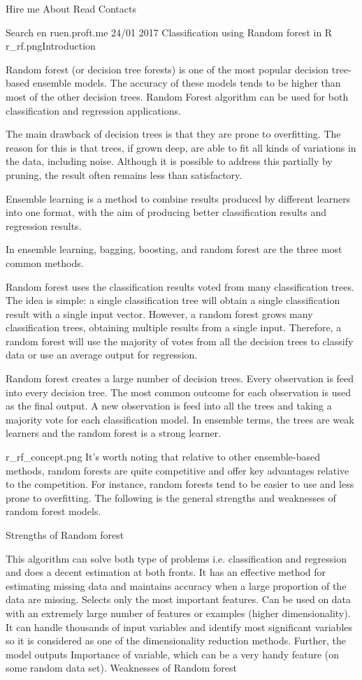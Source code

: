 Hire me About Read Contacts

 Search
en ruen.proft.me
24/01
2017
Classification using Random forest in R
r_rf.pngIntroduction

Random forest (or decision tree forests) is one of the most popular decision tree-based ensemble models. The accuracy of these models tends to be higher than most of the other decision trees. Random Forest algorithm can be used for both classification and regression applications.

The main drawback of decision trees is that they are prone to overfitting. The reason for this is that trees, if grown deep, are able to fit all kinds of variations in the data, including noise. Although it is possible to address this partially by pruning, the result often remains less than satisfactory.

Ensemble learning is a method to combine results produced by different learners into one format, with the aim of producing better classification results and regression results.

In ensemble learning, bagging, boosting, and random forest are the three most common methods.

Random forest uses the classification results voted from many classification trees. The idea is simple: a single classification tree will obtain a single classification result with a single input vector. However, a random forest grows many classification trees, obtaining multiple results from a single input. Therefore, a random forest will use the majority of votes from all the decision trees to classify data or use an average output for regression.

Random forest creates a large number of decision trees. Every observation is feed into every decision tree. The most common outcome for each observation is used as the final output. A new observation is feed into all the trees and taking a majority vote for each classification model. In ensemble terms, the trees are weak learners and the random forest is a strong learner.

r_rf_concept.png
It's worth noting that relative to other ensemble-based methods, random forests are quite competitive and offer key advantages relative to the competition. For instance, random forests tend to be easier to use and less prone to overfitting. The following is the general strengths and weaknesses of random forest models.

Strengths of Random forest

This algorithm can solve both type of problems i.e. classification and regression and does a decent estimation at both fronts.
It has an effective method for estimating missing data and maintains accuracy when a large proportion of the data are missing.
Selects only the most important features.
Can be used on data with an extremely large number of features or examples (higher dimensionality). It can handle thousands of input variables and identify most significant variables so it is considered as one of the dimensionality reduction methods. Further, the model outputs Importance of variable, which can be a very handy feature (on some random data set).
Weaknesses of Random forest

